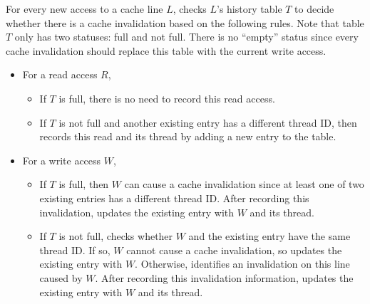 \begin{comment}
\begin{table}
\centering
  \begin{tabular}{ l | r }
    \hline
    {Thread ID} & {Type of Access} \\ \hline
    \hline
     &   \\ \hline
     &   \\ \hline
  \end{tabular}
  \caption{Two-entries-cache-history table for every cache line. \label{table:cachehistory}}
\end{table} 
\end{comment}

For every new access to a cache line $L$, \Predator{} checks $L$'s history table $T$ to decide whether there is a cache invalidation based on the following rules.  Note that table $T$ only has two statuses: full and not full.  There is no ``empty'' status since every cache invalidation should replace this table with the current write access.

\begin{itemize}
\item
  For a read access $R$, 
  \begin{itemize}
    \item
      If $T$ is full, there is no need to record this read access.
    \item
      If $T$ is not full and another existing entry has a different thread
      ID, then \Predator{} records this read and its thread by adding a new entry to the table. 
  \end{itemize}
\item
  For a write access $W$, 
  \begin{itemize}
    \item
      If $T$ is full, then $W$ can cause a cache invalidation since at least one of two existing entries has a different thread ID.
      After recording this invalidation, \Predator{} updates the
      existing entry with $W$ and its thread.
    \item
      If $T$ is not full,
      \Predator{} checks whether $W$ and the existing entry have the same thread ID. If
      so, $W$ cannot cause a cache invalidation, so \Predator{} updates the existing
      entry with $W$. Otherwise, \Predator{} identifies an invalidation on this line caused by $W$. 
      After recording this invalidation information, \Predator{} updates the
      existing entry with $W$ and its thread.
  \end{itemize}
\end{itemize}

